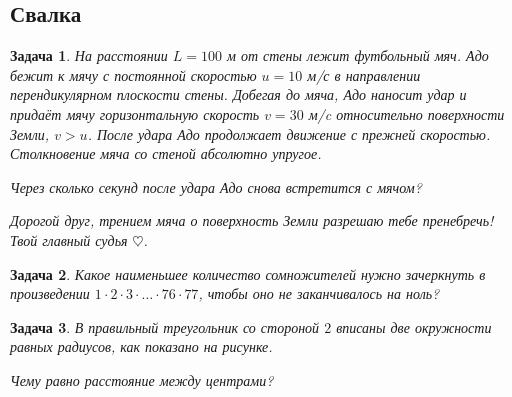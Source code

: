 \documentclass[a4paper, 11pt]{article}
\theoremstyle{break}
\newtheorem{problem}{Задача}[subsection]
\begin{document}
\thispagestyle{empty}
\subsection*{Свалка}

\begin{problem}
На расстоянии $L=100$ м от стены лежит футбольный мяч.
Адо бежит к мячу с постоянной скоростью $u=10$ м/с в направлении перендикулярном плоскости стены.
Добегая до мяча, Адо наносит удар и придаёт
мячу горизонтальную скорость $v=30$ м/c относительно поверхности Земли, $v>u$.
После удара Адо продолжает движение с прежней скоростью. Столкновение мяча со стеной абсолютно упругое.

Через сколько секунд после удара Адо снова встретится с мячом?

Дорогой друг, трением мяча о поверхность Земли разрешаю тебе пренебречь! Твой главный судья $\heartsuit$.
\end{problem}

\begin{problem}
Какое наименьшее количество сомножителей нужно зачеркнуть
в произведении $1\cdot 2\cdot 3\cdot \ldots \cdot 76\cdot 77$, чтобы
оно не заканчивалось на ноль?

%
\end{problem}


\begin{problem}
В правильный треугольник со стороной $2$ вписаны две окружности равных радиусов, как показано на рисунке.

Чему равно расстояние между центрами?


\begin{minipage}{0.8\textwidth}
\begin{center}
\end{center}
\end{minipage}


\end{problem}
\end{document}
